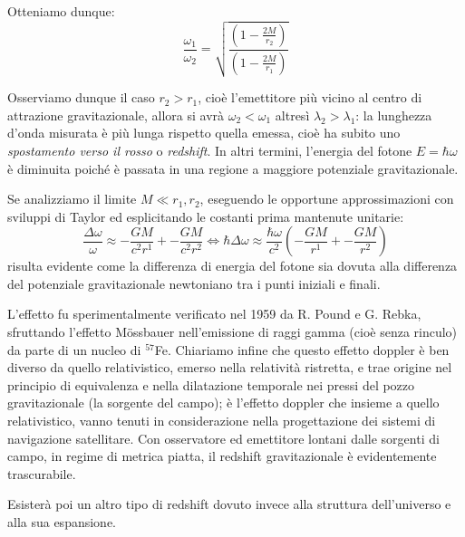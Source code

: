 Otteniamo dunque:
\begin{equation}
    \frac{\omega_1}{\omega_2} = \sqrt{\frac{\left( 1-\frac{2M}{r_2}\right)}{\left( 1-\frac{2M}{r_1}\right)}}
    \label{eq.redshift_frequenze}
\end{equation}

Osserviamo dunque il caso $r_2 > r_1$, cioè l'emettitore più vicino al centro di attrazione gravitazionale, allora si avrà $\omega_2 < \omega_1$ altresì $\lambda_2 > \lambda_1$: la lunghezza d'onda misurata è più lunga rispetto quella emessa, cioè ha subito uno \emph{spostamento verso il rosso} o \emph{redshift}. In altri termini, l'energia del fotone $E=\hbar \omega$ è diminuita poiché è passata in una regione a maggiore potenziale gravitazionale.

Se analizziamo il limite $M \ll r_1, r_2$, eseguendo le opportune approssimazioni con sviluppi di Taylor ed esplicitando le costanti prima mantenute unitarie:
\begin{equation*}
    \frac{\Delta \omega}{\omega} \approx - \frac{GM}{c^2r^1} + - \frac{GM}{c^2r^2} \iff \hbar \Delta \omega \approx \frac{\hbar \omega}{c^2}\left( - \frac{GM}{r^1} + - \frac{GM}{r^2}\right)
\end{equation*}
risulta evidente come la differenza di energia del fotone sia dovuta alla differenza del potenziale gravitazionale newtoniano tra i punti iniziali e finali.

L'effetto fu sperimentalmente verificato nel 1959 da R. Pound e G. Rebka, sfruttando l'effetto Mössbauer nell'emissione di raggi gamma (cioè senza rinculo) da parte di un nucleo di $^{57}$Fe.
Chiariamo infine che questo effetto doppler è ben diverso da quello relativistico, emerso nella relatività ristretta, e trae origine nel principio di equivalenza e nella dilatazione temporale nei pressi del pozzo gravitazionale (la sorgente del campo); è l'effetto doppler che insieme a quello relativistico, vanno tenuti in considerazione nella progettazione dei sistemi di navigazione satellitare. Con osservatore ed emettitore lontani dalle sorgenti di campo, in regime di metrica piatta, il redshift gravitazionale è evidentemente trascurabile.

Esisterà poi un altro tipo di redshift dovuto invece alla struttura dell'universo e alla sua espansione.


